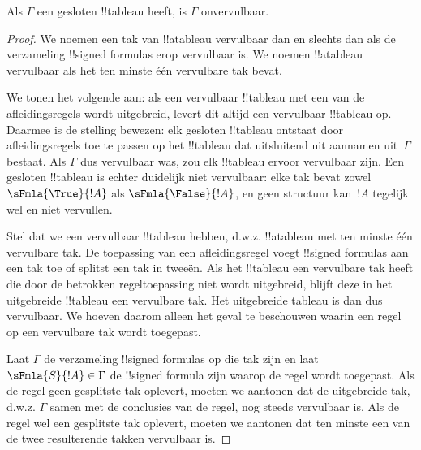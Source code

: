 \documentclass[../../../include/open-logic-section]{subfiles}
\begin{document}
\begin{thm}[Correctheid]
  Als $\Gamma$ een gesloten !!{tableau} heeft, is $\Gamma$
  onvervulbaar.
\end{thm}

\begin{proof}
We noemen een tak van !!a{tableau} vervulbaar dan en slechts dan als
de verzameling !!{signed formula}s erop vervulbaar is. We noemen
!!a{tableau} vervulbaar als het ten minste één vervulbare tak bevat.

We tonen het volgende aan: als een vervulbaar !!{tableau} met een van
de afleidingsregels wordt uitgebreid, levert dit altijd een
vervulbaar !!{tableau} op. Daarmee is de stelling bewezen: elk gesloten
!!{tableau} ontstaat door afleidingsregels toe te passen op het
!!{tableau} dat uitsluitend uit aannamen uit~$\Gamma$ bestaat. Als
$\Gamma$ dus vervulbaar was, zou elk !!{tableau} ervoor vervulbaar
zijn. Een gesloten !!{tableau} is echter duidelijk niet vervulbaar:
elke tak bevat zowel $\sFmla{\True}{!A}$ als
$\sFmla{\False}{!A}$, en geen structuur kan~$!A$ tegelijk wel en niet
vervullen.

Stel dat we een vervulbaar !!{tableau} hebben, d.w.z. !!a{tableau} met
ten minste één vervulbare tak. De toepassing van een afleidingsregel
voegt !!{signed formula}s aan een tak toe of splitst een tak in tweeën.
Als het !!{tableau} een vervulbare tak heeft die door de betrokken
regeltoepassing niet wordt uitgebreid, blijft deze in het uitgebreide
!!{tableau} een vervulbare tak. Het uitgebreide tableau is dan dus
vervulbaar. We hoeven daarom alleen het geval te beschouwen waarin een
regel op een vervulbare tak wordt toegepast.

Laat $\Gamma$ de verzameling !!{signed formula}s op die tak zijn en
laat $\sFmla{S}{!A} \in \Gamma$ de !!{signed formula} zijn waarop de
regel wordt toegepast. Als de regel geen gesplitste tak oplevert,
moeten we aantonen dat de uitgebreide tak, d.w.z. $\Gamma$ samen met
de conclusies van de regel, nog steeds vervulbaar is. Als de regel wel
een gesplitste tak oplevert, moeten we aantonen dat ten minste een van
de twee resulterende takken vervulbaar is.
  

\end{proof}
\end{document}
